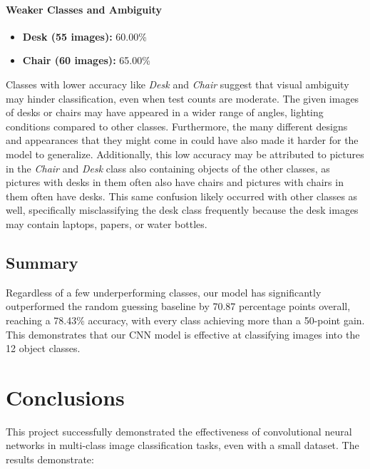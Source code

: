 \documentclass[10pt]{article}
\begin{document}
\paragraph{Weaker Classes and Ambiguity}
\begin{itemize}
  \item \textbf{Desk (55 images):} 60.00\%
  \item \textbf{Chair (60 images):} 65.00\%
\end{itemize}
Classes with lower accuracy like \emph{Desk} and \emph{Chair} suggest that visual ambiguity may hinder classification, even when test counts are moderate. The given images of desks or chairs may have appeared in a wider range of angles, lighting conditions compared to other classes. Furthermore, the many different designs and appearances that they might come in could have also made it harder for the model to generalize. Additionally, this low accuracy may be attributed to pictures in the \emph{Chair} and \emph{Desk} class also containing objects of the other classes, as pictures with desks in them often also have chairs and pictures with chairs in them often have desks. This same confusion likely occurred with other classes as well, specifically misclassifying the desk class frequently because the desk images may contain laptops, papers, or water bottles.

\subsection{Summary}
Regardless of a few underperforming classes, our model has significantly outperformed the random guessing baseline by 70.87 percentage points overall, reaching a 78.43\% accuracy, with every class achieving more than a 50-point gain. 
This demonstrates that our CNN model is effective at classifying images into the 12 object classes. 





\section{Conclusions}
This project successfully demonstrated the effectiveness of convolutional neural networks in multi-class image classification tasks, even with a small dataset. The results demonstrate:
\end{document}
